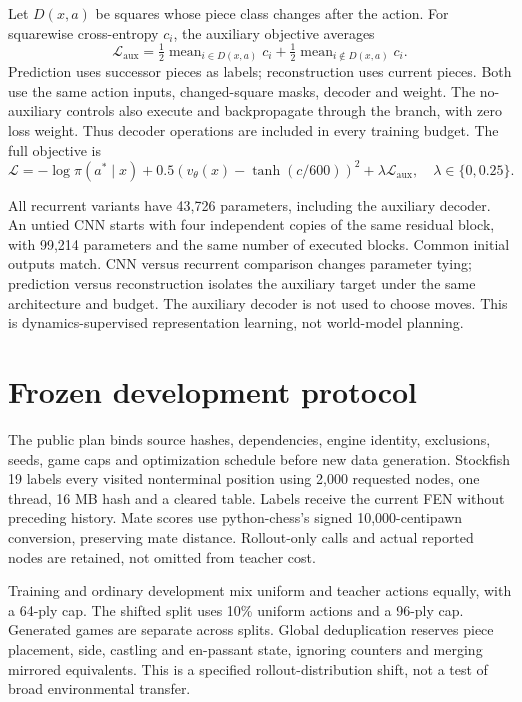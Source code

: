 \documentclass[10pt]{article}
\begin{document}
Let $D(x,a)$ be squares whose piece class changes after the action. For squarewise
cross-entropy $c_i$, the auxiliary objective averages
\begin{equation}
 \mathcal L_{\mathrm{aux}}=\tfrac12\operatorname{mean}_{i\in D(x,a)}c_i+
                         \tfrac12\operatorname{mean}_{i\notin D(x,a)}c_i.
\end{equation}
Prediction uses successor pieces as labels; reconstruction uses current pieces.
Both use the same action inputs, changed-square masks, decoder and weight.
The no-auxiliary controls also execute and backpropagate through the branch,
with zero loss weight. Thus decoder operations are included in every training
budget. The full objective is
\begin{equation}
 \mathcal L= -\log\pi(a^*\mid x)+0.5(v_\theta(x)-\tanh(c/600))^2
               +\lambda\mathcal L_{\mathrm{aux}},
 \quad \lambda\in\{0,0.25\}.
\end{equation}

All recurrent variants have 43,726 parameters, including the auxiliary decoder.
An untied CNN starts with four independent copies of the same residual block,
with 99,214 parameters and the same number of executed blocks. Common initial
outputs match. CNN versus recurrent comparison changes parameter tying;
prediction versus reconstruction isolates the auxiliary target under the same
architecture and budget. The auxiliary decoder is not used to choose moves.
This is dynamics-supervised representation learning, not world-model planning.

\section{Frozen development protocol}
The public plan binds source hashes, dependencies, engine identity, exclusions,
seeds, game caps and optimization schedule before new data generation.
Stockfish 19 labels every visited nonterminal position using 2,000 requested
nodes, one thread, 16 MB hash and a cleared table. Labels receive the current FEN
without preceding history. Mate scores use python-chess's signed 10,000-centipawn
conversion, preserving mate distance. Rollout-only calls and actual reported
nodes are retained, not omitted from teacher cost.

Training and ordinary development mix uniform and teacher actions equally,
with a 64-ply cap. The shifted split uses 10\% uniform actions and a 96-ply cap.
Generated games are separate across splits. Global deduplication reserves piece
placement, side, castling and en-passant state, ignoring counters and merging
mirrored equivalents. This is a specified rollout-distribution shift, not a test
of broad environmental transfer.
\end{document}

